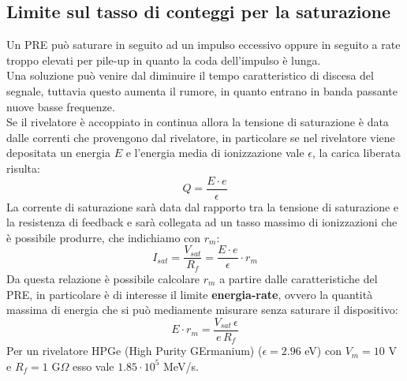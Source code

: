 \subsection{Limite sul tasso di conteggi per la saturazione}
Un PRE pu\`o saturare in seguito ad un impulso eccessivo oppure in seguito a rate troppo elevati per pile-up in quanto la coda dell'impulso \`e lunga.\\
Una soluzione pu\`o venire dal diminuire il tempo caratteristico di discesa del segnale, tuttavia questo aumenta il rumore, in quanto entrano in banda passante 
nuove basse frequenze.\\
Se il rivelatore \`e accoppiato in continua allora la tensione di saturazione \`e data dalle correnti che provengono dal rivelatore, in particolare
se nel rivelatore viene depositata un energia $E$ e l'energia media di ionizzazione vale $\epsilon$, la carica liberata risulta:
\begin{equation*}
Q = \frac{E\cdot e}{\epsilon}
\end{equation*}
La corrente di saturazione sar\`a data dal rapporto tra la tensione di saturazione e la resistenza di feedback e sar\`a collegata ad un tasso massimo di ionizzazioni
che \`e possibile produrre, che indichiamo con $r_m$:
\begin{equation*}
I_{sat} = \frac{V_{sat}}{R_f} = \frac{E \cdot e}{\epsilon} \cdot r_m
\end{equation*}
Da questa relazione \`e possibile calcolare $r_m$ a partire dalle caratteristiche del PRE, in particolare \`e di interesse il limite \textbf{energia-rate}, ovvero
la quantit\`a massima di energia che si pu\`o mediamente misurare senza saturare il dispositivo:
\begin{equation*}
E \cdot r_m = \frac{V_{sat} \, \epsilon}{e\, R_f}
\end{equation*}
Per un rivelatore HPGe (High Purity GErmanium) ($\epsilon = 2.96$ eV) con $V_m = 10$ V e $R_f = 1$ G$\Omega$ esso vale $1.85 \cdot 10^5$ MeV/s.
